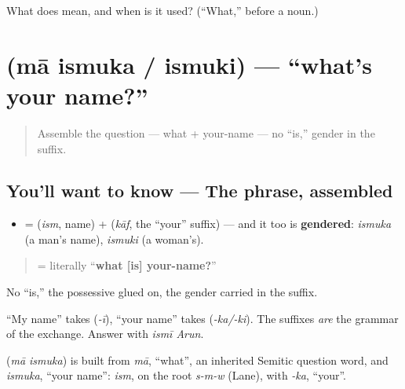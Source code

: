 \begin{tcolorbox}[breakable,colback=teal!4,colframe=teal!35!black,title={Before you move on}]
What does \textbf{} mean, and when is it used? (\textquotedblleft{}What,\textquotedblright{} before a noun.)
\end{tcolorbox}
\section[\texorpdfstring{\ar{ما} \ar{اسمك؟} (mā ismuka)}{ما اسمك؟ (mā ismuka)}]{  (mā ismuka / ismuki) — \textquotedblleft{}what's your name?\textquotedblright{}}

\label{lesson:AR-C02-maa-ismuka}



\begin{quote}
Assemble the question — what + your-name — no \textquotedblleft{}is,\textquotedblright{} gender in the suffix.
\end{quote}

\subsection*{You'll want to know — The phrase, assembled}
\begin{itemize}
\raggedright
  \item \textbf{} = \textbf{} (\emph{ism}, name) + \textbf{} (\emph{kāf}, the \textquotedblleft{}your\textquotedblright{} suffix) — and it too is \textbf{gendered}: \emph{ismuka} (a man's name), \emph{ismuki} (a woman's).
\end{itemize}

\begin{quote}
\textbf{ } = literally \textquotedblleft{}\textbf{what {[}is{]} your-name?}\textquotedblright{}
\end{quote}

No \textquotedblleft{}is,\textquotedblright{} the possessive glued on, the gender carried in the suffix.

\begin{grammarlens}[title={Grammar Lens: the matched suffixes}]
\textquotedblleft{}My name\textquotedblright{} takes \textbf{} (\emph{-ī}), \textquotedblleft{}your name\textquotedblright{} takes \textbf{} (\emph{-ka/-ki}). The suffixes \emph{are} the grammar of the exchange. Answer with \emph{ismī Arun}.
\end{grammarlens}

\begin{cousinweb}
\textbf{ } (\emph{mā ismuka}) is built from \emph{mā}, \textquotedblleft{}what\textquotedblright{}, an inherited Semitic question word, and \emph{ismuka}, \textquotedblleft{}your name\textquotedblright{}: \emph{ism}, on the root \emph{s-m-w} (Lane), with \emph{-ka}, \textquotedblleft{}your\textquotedblright{}.
\end{cousinweb}

